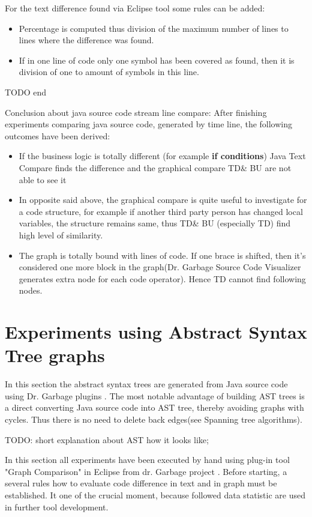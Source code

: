 \documentclass{report}
\begin{document}
For the text difference found via Eclipse tool some rules can be added:
\begin{itemize}
	\item Percentage is computed thus division of the maximum number of lines to lines where the difference was found.
	\item If in one line of code only one symbol has been covered as found, then it is division of one to amount of symbols in this line. 
\end{itemize}

TODO end

Conclusion about java source code stream line compare:
After finishing experiments comparing java source code, generated by time line, the following outcomes have been derived:

\begin{itemize}
	\item If the business logic is totally different (for example \textbf{if conditions}) Java Text Compare finds the difference and the graphical compare TD\& BU are not able to see it
	\item In opposite said above, the graphical compare is quite useful to investigate for a code structure, for example if another third party person has changed local variables, the structure remains same, thus TD\& BU (especially TD) find high level of similarity.
	\item The graph is totally bound with lines of code. If one brace is shifted, then it's considered one more block in the graph(Dr. Garbage Source Code Visualizer \cite{drgarbage} generates extra node for each code operator). Hence TD cannot find following nodes.
\end{itemize}

\section{Experiments using Abstract Syntax Tree graphs}

In this section the abstract syntax trees are generated from Java source code using Dr. Garbage plugins \cite{drgarbage}.
The most notable advantage of building AST trees is a direct converting Java source code into AST tree, thereby avoiding graphs with cycles. Thus there is no need to delete back edges(see Spanning tree algorithms).

TODO: short explanation about AST how it looks like;

In this section all experiments have been executed by hand using plug-in tool "Graph Comparison" in Eclipse from dr. Garbage project \cite{drgarbage}.  Before starting, a several rules how to evaluate code difference in text and in graph must be established. It one of the crucial moment, because followed data statistic are used in further tool development.
\end{document}
